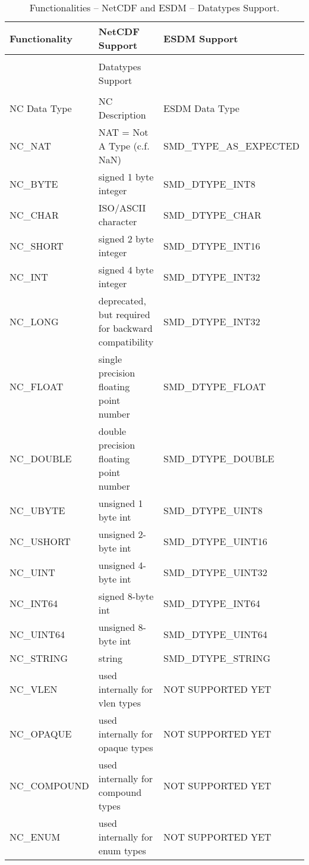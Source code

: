 \begin{table}[H]
\centering
\begin{tabular}{|l|m{6cm}|l|}
\hline
Functionality & NetCDF Support & ESDM Support \\ \hline \hline

& & \\
& \large{Datatypes Support} & \\
& & \\ \hline \hline

NC Data Type  &  NC Description  & ESDM Data Type  \\ \hline

NC\_NAT & NAT = Not A Type (c.f. NaN) &    SMD\_TYPE\_AS\_EXPECTED        \\ \hline
NC\_BYTE & signed 1 byte integer &     SMD\_DTYPE\_INT8        \\ \hline
NC\_CHAR & ISO/ASCII character &      SMD\_DTYPE\_CHAR       \\ \hline
NC\_SHORT & signed 2 byte integer &   SMD\_DTYPE\_INT16          \\ \hline
NC\_INT & signed 4 byte integer &     SMD\_DTYPE\_INT32        \\ \hline
NC\_LONG & deprecated, but required for backward compatibility &    SMD\_DTYPE\_INT32         \\ \hline
NC\_FLOAT & single precision floating point number &   SMD\_DTYPE\_FLOAT           \\ \hline
NC\_DOUBLE & double precision floating point number &   SMD\_DTYPE\_DOUBLE          \\ \hline
NC\_UBYTE & unsigned 1 byte int &     SMD\_DTYPE\_UINT8        \\ \hline
NC\_USHORT & unsigned 2-byte int &    SMD\_DTYPE\_UINT16         \\ \hline
NC\_UINT & unsigned 4-byte int &   SMD\_DTYPE\_UINT32          \\ \hline
NC\_INT64 & signed 8-byte int &    SMD\_DTYPE\_INT64         \\ \hline
NC\_UINT64 & unsigned 8-byte int &    SMD\_DTYPE\_UINT64         \\ \hline
NC\_STRING & string &    SMD\_DTYPE\_STRING         \\ \hline
NC\_VLEN & used internally for vlen types &      NOT SUPPORTED YET       \\ \hline
NC\_OPAQUE & used internally for opaque types &     NOT SUPPORTED YET        \\ \hline
NC\_COMPOUND & used internally for compound types &    NOT SUPPORTED YET         \\ \hline
NC\_ENUM & used internally for enum types &       NOT SUPPORTED YET      \\ \hline \hline
\end{tabular}
\caption{Functionalities -- NetCDF and ESDM -- Datatypes Support.}
\end{table}

